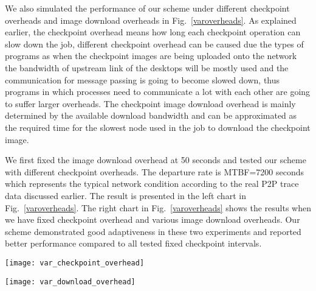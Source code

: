 \documentclass[times, 12pt, onecolumn]{article}
\newcommand{\reffig}[1]{Fig.~\ref{#1}}
\begin{document}
We also  simulated the performance of our scheme under different checkpoint overheads and image download overheads in 
\reffig{varoverheads}. As explained earlier, the checkpoint overhead means how long each checkpoint operation
can slow down the job, different checkpoint overhead can be caused due the types of programs as when the checkpoint 
images are being uploaded onto the network the bandwidth of upstream link of the desktops will be mostly used and 
the communication for message passing is going to become slowed down, thus programs in which processes need to 
communicate a lot with each other are going to suffer larger overheads. The checkpoint image download overhead is 
mainly determined by the available download bandwidth and can be approximated as the required time for the slowest 
node used in the job to download the checkpoint image. 

We first fixed the image download overhead at 50 seconds and tested our scheme with different checkpoint overheads.
The departure rate is MTBF=7200 seconds which represents the typical network condition according to the real P2P trace data
discussed earlier. The result is presented in the left chart in \reffig{varoverheads}. The right chart in 
\reffig{varoverheads} shows the results when we have fixed checkpoint overhead and various image download overheads. 
Our scheme demonstrated good adaptiveness in these two experiments and reported better performance compared to all 
tested fixed checkpoint intervals. 

\begin{figure*}
\begin{minipage}[b]{0.46\linewidth}
\centering
\texttt{[image: var\_checkpoint\_overhead]}
\end{minipage}
\begin{minipage}[b]{0.33\linewidth}
\centering
\texttt{[image: var\_download\_overhead]}
\end{minipage}
\caption{Performance Comparison Under Different overheads.}
\label{varoverheads}
\end{figure*}
\end{document}
